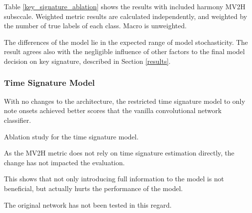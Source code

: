 Table \ref{key_signature_ablation} shows the results with included harmony MV2H subsccale. Weighted metric results are calculated independently, and weighted by the number of true labels of each class. Macro is unweighted.

The differences of the model lie in the expected range of model stochasticity. The result agrees also with the negligible influence of other factors to the final model decision on key signature, described in Section \ref{results}.

\subsubsection{Time Signature Model}

With no changes to the architecture, the restricted time signature model to only note onsets achieved better scores that the vanilla convolutional network classifier.  

\begin{table}[ht!]
\centering

\caption[Ablation study for the time signature model.]{Ablation study for the time signature model.}
\label{time_signature_ablation}
\end{table}

As the MV2H metric does not rely on time signature estimation directly, the change has not impacted the evaluation.

This shows that not only introducing full information to the model is not beneficial, but actually hurts the performance of the model. 

The original network has not been tested in this regard.
